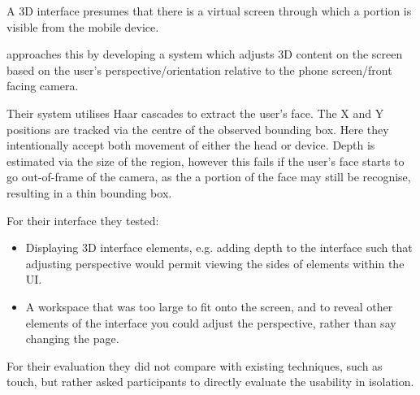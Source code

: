 A 3D interface presumes that there is a virtual screen through which a portion is visible from the mobile device.

\citeauthor{francone2011using} approaches this by developing a system which adjusts 3D content on the screen based on the user's perspective/orientation relative to the phone screen/front facing camera\cite{francone2011using}.

Their system utilises Haar cascades to extract the user's face. The X and Y positions are tracked via the centre of the observed bounding box. Here they intentionally accept both movement of  either the head or device.
Depth is estimated via the size of the region, however this fails if the user's face starts to go out-of-frame of the camera, as the a portion of the face may still be recognise, resulting in a thin bounding box.

For their interface they tested:
\begin{itemize}
    \item Displaying 3D interface elements, e.g. adding depth to the interface such that adjusting perspective would permit viewing the sides of elements within the UI.
    \item A workspace that was too large to fit onto the screen, and to reveal other elements of the interface you could adjust the perspective, rather than say changing the page.
\end{itemize}
For their evaluation they did not compare with existing techniques, such as touch, but rather asked participants to directly evaluate the usability in isolation.

